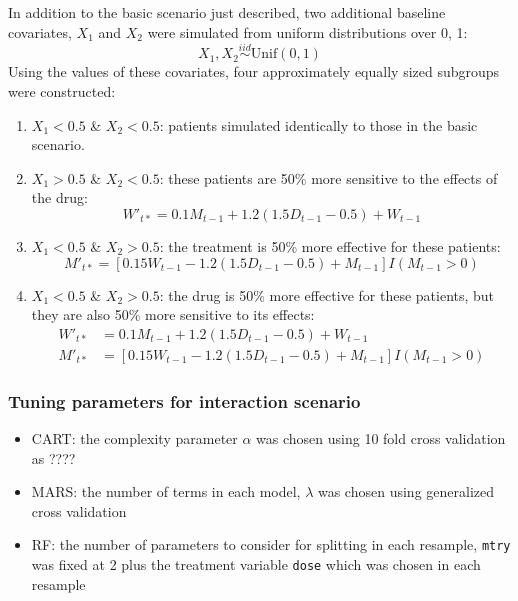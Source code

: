 \documentclass[12pt]{article}
\begin{document}
In addition to the basic scenario just described, two additional baseline covariates, $X_{1}$ and $X_{2}$ were simulated from uniform distributions over 0, 1:
\begin{equation}
  X_{1}, X_{2} \overset{iid}{\sim} \text{Unif}(0, 1) 
\end{equation}
Using the values of these covariates, four approximately equally sized subgroups were constructed:
\begin{enumerate}
  \item $X_{1} < 0.5$ \& $X_{2} < 0.5$: patients simulated identically to those in the basic scenario.
  \item $X_{1} > 0.5$ \& $X_{2} < 0.5$: these patients are 50\% more sensitive to the effects of the drug:
   \begin{equation}
   W'_{t*} = 0.1 M_{t-1} + 1.2 (1.5 D_{t-1} - 0.5) + W_{t - 1}
   \end{equation}
   \item $X_{1} < 0.5$ \& $X_{2} > 0.5$: the treatment is 50\% more effective for these patients:
\begin{equation}
M'_{t*} = [0.15 W_{t-1} - 1.2 (1.5 D_{t-1} - 0.5) + M_{t - 1}] I(M_{t-1} > 0)
\end{equation}
   \item $X_{1} < 0.5$ \& $X_{2} > 0.5$: the drug is 50\% more effective for these patients, but they are also 50\% more sensitive to its effects:
   \begin{align}
   W'_{t*} &= 0.1 M_{t-1} + 1.2 (1.5 D_{t-1} - 0.5) + W_{t - 1} \\
   M'_{t*} &= [0.15 W_{t-1} - 1.2 (1.5 D_{t-1} - 0.5) + M_{t - 1}] I(M_{t-1} > 0)
   \end{align}
\end{enumerate}

\subsubsection{Tuning parameters for interaction scenario} %
\label{ssub:tuning_parameters_for_interaction_scenario}

\begin{itemize}
  \item CART: the complexity parameter $\alpha$ was chosen using 10 fold cross validation as ????
  \item MARS: the number of terms in each model, $\lambda$ was chosen using generalized cross validation
  \item RF: the number of parameters to consider for splitting in each resample, \texttt{mtry} was fixed at 2 plus the treatment variable \texttt{dose} which was chosen in each resample
\end{itemize}
\end{document}
